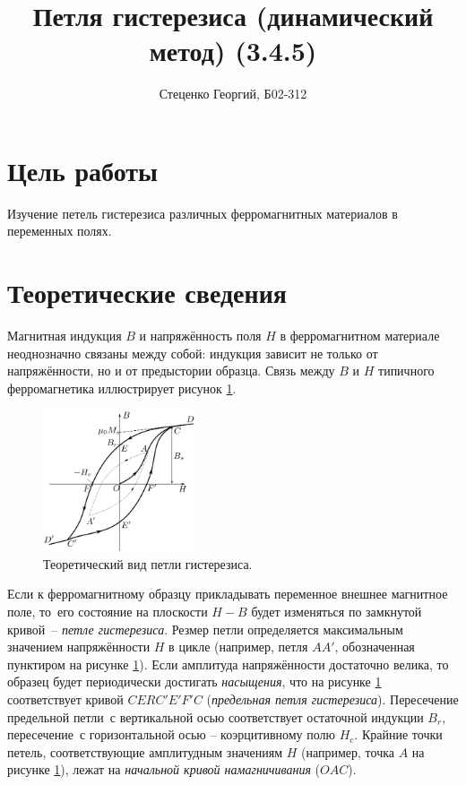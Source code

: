 \documentclass[12pt, a4paper]{article}
\title{Петля гистерезиса (динамический метод) (3.4.5)}
\author{Стеценко Георгий, Б02-312}
\date{}
\begin{document}
\maketitle

\section{Цель работы}
Изучение петель гистерезиса различных ферромагнитных материалов в переменных полях.

\section{Теоретические сведения}
Магнитная индукция $B$ и напряжённость поля $H$ в ферромагнитном материале неоднозначно связаны между собой: индукция зависит не только от напряжённости, но и от предыстории образца. Связь между $B$ и $H$ типичного ферромагнетика иллюстрирует рисунок \ref{Theor}.

\begin{figure}\vspace{-6mm}
  \centering
  \includegraphics[width=4.5cm]{pics/Theor}
  \caption{Теоретический вид петли гистерезиса.}
  \label{Theor}
\end{figure}

Если к ферромагнитному образцу прикладывать переменное внешнее магнитное поле, то~его состояние на плоскости $H-B$ будет изменяться по замкнутой кривой~-- \textit{петле гистерезиса}.
Резмер петли определяется максимальным значением напряжённости $H$ в цикле (например, петля $AA'$, обозначенная пунктиром на рисунке \ref{Theor}).
Если амплитуда напряжённости достаточно велика, то образец будет периодически достигать \textit{насыщения},
что на рисунке \ref{Theor} соответствует кривой $CERC'E'F'C$ (\textit{предельная петля гистерезиса}).
Пересечение предельной петли~с вертикальной осью соответствует остаточной индукции $B_r$, пересечение~с горизонтальной осью -- коэрцитивному полю $H_c$.
Крайние точки петель, соответствующие амплитудным значениям $H$ (например, точка $A$ на рисунке \ref{Theor}), лежат на \textit{начальной кривой намагничивания} ($OAC$).
\end{document}
